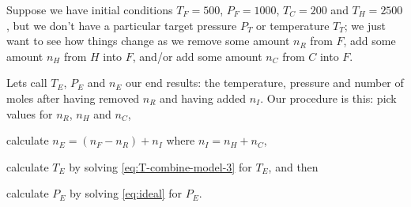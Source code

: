 \documentclass{article}
\begin{document}
\begin{example}
    Suppose we have initial conditions $T_F=500$, $P_F=1000$, $T_C=200$ and $T_H=2500$,
    but we don't have a particular target pressure $P_T$ or temperature $T_T$;
    we just want to see how things change as we remove some amount $n_R$ from $F$,
    add some amount $n_H$ from $H$ into $F$,
    and/or add some amount $n_C$ from $C$ into $F$.

    Lets call $T_E$, $P_E$ and $n_E$ our end results: the temperature, pressure and number
    of moles after having removed $n_R$ and having added $n_I$.
    Our procedure is this: pick values for $n_R$, $n_H$ and $n_C$,
    \begin{enumerate*}[label=(\alph*)]
        \item calculate $n_E=(n_F-n_R)+n_I$ where $n_I=n_H+n_C$,
        \item calculate $T_E$ by solving \autoref{eq:T-combine-model-3} for $T_E$, and then
        \item calculate $P_E$ by solving \autoref{eq:ideal} for $P_E$.
    \end{enumerate*}


\end{example}
\end{document}
